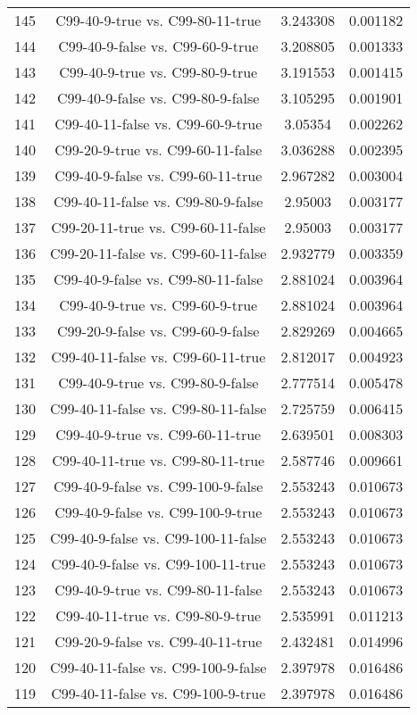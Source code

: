 \documentclass[a4paper,10pt]{article}
\begin{document}
\begin{landscape}
\begin{table}[!htp]
\begin{tabular}{cccc}
145&C99-40-9-true vs. C99-80-11-true&3.243308&0.001182\\
144&C99-40-9-false vs. C99-60-9-true&3.208805&0.001333\\
143&C99-40-9-true vs. C99-80-9-true&3.191553&0.001415\\
142&C99-40-9-false vs. C99-80-9-false&3.105295&0.001901\\
141&C99-40-11-false vs. C99-60-9-true&3.05354&0.002262\\
140&C99-20-9-true vs. C99-60-11-false&3.036288&0.002395\\
139&C99-40-9-false vs. C99-60-11-true&2.967282&0.003004\\
138&C99-40-11-false vs. C99-80-9-false&2.95003&0.003177\\
137&C99-20-11-true vs. C99-60-11-false&2.95003&0.003177\\
136&C99-20-11-false vs. C99-60-11-false&2.932779&0.003359\\
135&C99-40-9-false vs. C99-80-11-false&2.881024&0.003964\\
134&C99-40-9-true vs. C99-60-9-true&2.881024&0.003964\\
133&C99-20-9-false vs. C99-60-9-false&2.829269&0.004665\\
132&C99-40-11-false vs. C99-60-11-true&2.812017&0.004923\\
131&C99-40-9-true vs. C99-80-9-false&2.777514&0.005478\\
130&C99-40-11-false vs. C99-80-11-false&2.725759&0.006415\\
129&C99-40-9-true vs. C99-60-11-true&2.639501&0.008303\\
128&C99-40-11-true vs. C99-80-11-true&2.587746&0.009661\\
127&C99-40-9-false vs. C99-100-9-false&2.553243&0.010673\\
126&C99-40-9-false vs. C99-100-9-true&2.553243&0.010673\\
125&C99-40-9-false vs. C99-100-11-false&2.553243&0.010673\\
124&C99-40-9-false vs. C99-100-11-true&2.553243&0.010673\\
123&C99-40-9-true vs. C99-80-11-false&2.553243&0.010673\\
122&C99-40-11-true vs. C99-80-9-true&2.535991&0.011213\\
121&C99-20-9-false vs. C99-40-11-true&2.432481&0.014996\\
120&C99-40-11-false vs. C99-100-9-false&2.397978&0.016486\\
119&C99-40-11-false vs. C99-100-9-true&2.397978&0.016486\\

\end{tabular}
\end{table}
\end{landscape}
\end{document}
